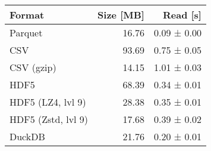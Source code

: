 \begin{tabular}{lrr}
\toprule
Format & Size [MB] & Read [s] \\
\midrule
Parquet & 16.76 & 0.09 ± 0.00 \\
CSV & 93.69 & 0.75 ± 0.05 \\
CSV (gzip) & 14.15 & 1.01 ± 0.03 \\
HDF5 & 68.39 & 0.34 ± 0.01 \\
HDF5 (LZ4, lvl 9) & 28.38 & 0.35 ± 0.01 \\
HDF5 (Zstd, lvl 9) & 17.68 & 0.39 ± 0.02 \\
DuckDB & 21.76 & 0.20 ± 0.01 \\
\bottomrule
\end{tabular}
